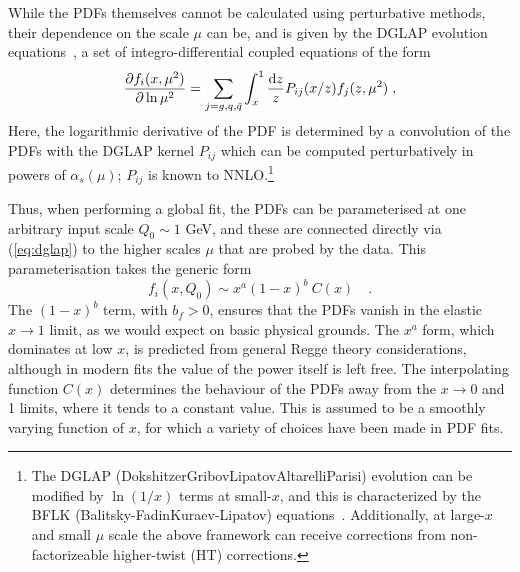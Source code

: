 While the PDFs themselves cannot be calculated using perturbative methods, their dependence on the scale $\mu$ can be, and is given by the  
DGLAP evolution equations~\cite{Dokshitzer:1977sg,Gribov:1972ri,Altarelli:1977zs},
a set of integro-differential coupled equations of the form
\begin{equation}
  \label{eq:dglap}
\frac{\partial f_i(x,\mu^2)}{\partial \ln \mu^2}=\sum_{j=g,q,\bar{q}}\int_x^1 \frac{{\rm d}z}{z}P_{ij}(x/z)f_j(z,\mu^2)\;,
\end{equation}
Here, the logarithmic derivative of the PDF is determined by a convolution
of the PDFs with the DGLAP kernel $P_{ij}$ which can be computed
perturbatively in powers of $\alpha_{s}(\mu)$; $P_{ij}$ is known
to NNLO.\footnote{The DGLAP (Dokshitzer\textendash Gribov\textendash Lipatov\textendash Altarelli\textendash Parisi)
evolution can be modified by $\ln(1/x)$ terms at small-$x$, and
this is characterized by the BFLK (Balitsky-FadinKuraev-Lipatov) equations~\cite{Kuraev:1976ge,Kuraev:1977fs,Balitsky:1978ic}.
%
Additionally, at large-$x$ and small $\mu$ scale the above framework
can receive corrections from non-factorizeable higher-twist (HT) corrections.} 

Thus, when performing a global fit, the PDFs can be parameterised at one arbitrary input scale $Q_0\sim 1$ GeV, and these are connected directly via (\ref{eq:dglap}) to the higher scales $\mu$ that are probed by the data.
This parameterisation takes the generic form
\begin{equation}\label{eq:pdffunc}
f_{i}(x,Q_0)\sim x^{a}(1-x)^{b}\:C(x)\quad.
\end{equation}
The $(1-x)^b$ term, with $b_{f}>0$, ensures that the PDFs vanish in the elastic $x\to 1$ limit, as we would expect on basic physical grounds. 
The $x^a$ form, which dominates at low $x$, is predicted from general Regge theory considerations, although in modern fits the value of the power itself is left free. The interpolating function $C(x)$ determines the behaviour of the PDFs away from the $x\to 0$ and 1 limits, where it tends to a constant value. This is assumed to be a smoothly varying function of $x$, for which a variety of choices have been made in PDF fits.

